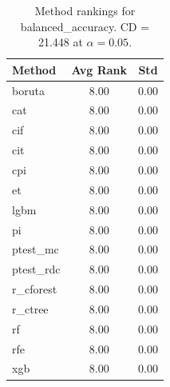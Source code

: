 \begin{table}[h]
\centering
\caption{Method rankings for balanced_accuracy. CD = 21.448 at $\alpha=0.05$.}
\label{tab:ranks_balanced_accuracy}
\begin{tabular}{lcc}
\toprule
Method & Avg Rank & Std \\
\midrule
boruta & 8.00 & 0.00 \\
cat & 8.00 & 0.00 \\
cif & 8.00 & 0.00 \\
cit & 8.00 & 0.00 \\
cpi & 8.00 & 0.00 \\
et & 8.00 & 0.00 \\
lgbm & 8.00 & 0.00 \\
pi & 8.00 & 0.00 \\
ptest_mc & 8.00 & 0.00 \\
ptest_rdc & 8.00 & 0.00 \\
r_cforest & 8.00 & 0.00 \\
r_ctree & 8.00 & 0.00 \\
rf & 8.00 & 0.00 \\
rfe & 8.00 & 0.00 \\
xgb & 8.00 & 0.00 \\
\bottomrule
\end{tabular}
\end{table}